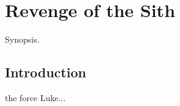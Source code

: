 
\chapter{Revenge of the Sith}
	\label{chapter:revenge-of-sith}%



\begin{synopsis}
	Synopsis.
\end{synopsis}


\section{Introduction}

 the force Luke...

